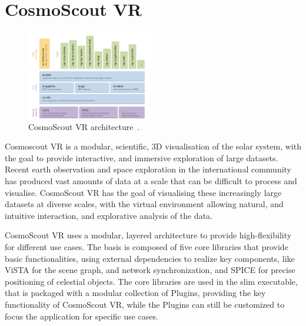 \section{CosmoScout VR}\label{sec:cosmoscout-vr}

\begin{figure}
    \centering
    \includegraphics[width=0.5\textwidth]{content/2_3_cosmoscout/img/cosmoscout-architecture}
    \caption{CosmoScout VR architecture~\cite{CSVR}.}
    \label{fig:cosmoscout-architecture}
\end{figure}

Cosmoscout VR is a modular, scientific, 3D visualisation of the solar system, with the goal to provide interactive,
and immersive exploration of large datasets.
Recent earth observation and space exploration in the international community has produced vast amounts of data at a
scale that can be difficult to process and visualise.
CosmoScout VR has the goal of visualising these increasingly large datasets at diverse scales, with the virtual
environment allowing natural, and intuitive interaction, and explorative analysis of the data.

CosmoScout VR uses a modular, layered architecture to provide high-flexibility for different use cases.
The basis is composed of five core libraries that provide basic functionalities, using external dependencies to
realize key components, like ViSTA for the scene graph, and network synchronization, and SPICE for precise positioning
of celestial objects.
The core libraries are used in the slim executable, that is packaged with a modular collection of Plugins, providing
the key functionality of CosmoScout VR, while the Plugins can still be customized to focus the application for
specific use cases.
